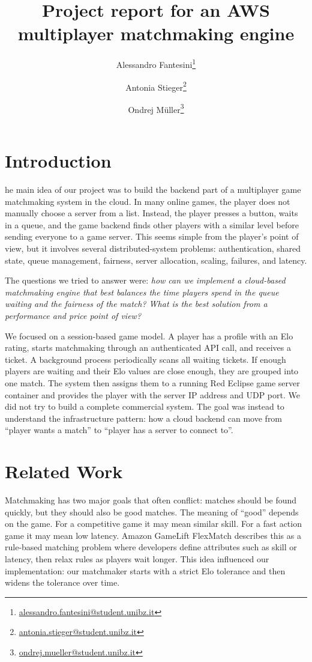 \documentclass[9pt,a4paper,twocolumn,twoside]{tau-class/tau}
\title{Project report for an AWS multiplayer matchmaking engine}
\author[a,1]{Alessandro Fantesini\thanks{\href{mailto:alessandro.fantesini@student.unibz.it}{alessandro.fantesini@student.unibz.it}}}
\author[b,2]{Antonia Stieger\thanks{\href{mailto:antonia.stieger@student.unibz.it}{antonia.stieger@student.unibz.it}}}
\author[c,3]{Ondrej M\"uller\thanks{\href{mailto:ondrej.mueller@student.unibz.it}{ondrej.mueller@student.unibz.it}}}
\affil[a]{Free University of Bozen-Bolzano, Italy}
\affil[b]{Free University of Bozen-Bolzano, Italy}
\affil[c]{Free University of Bozen-Bolzano, Italy}
\begin{document}
    \maketitle
    \thispagestyle{firststyle}


\section{Introduction}

    he main idea of our project was to build the backend part of a multiplayer game matchmaking system in the cloud. In many online games, the player does not manually choose a server from a list. Instead, the player presses a button, waits in a queue, and the game backend finds other players with a similar level before sending everyone to a game server. This seems simple from the player's point of view, but it involves several distributed-system problems: authentication, shared state, queue management, fairness, server allocation, scaling, failures, and latency.

    The questions we tried to answer were: \textit{how can we implement a cloud-based matchmaking engine that best balances the time players spend in the queue waiting and the fairness of the match? What is the best solution from a performance and price point of view?} 
    
    We focused on a session-based game model. A player has a profile with an Elo rating, starts matchmaking through an authenticated API call, and receives a ticket. A background process periodically scans all waiting tickets. If enough players are waiting and their Elo values are close enough, they are grouped into one match. The system then assigns them to a running Red Eclipse game server container and provides the player with the server IP address and UDP port.
    We did not try to build a complete commercial system. 
    The goal was instead to understand the infrastructure pattern: how a cloud backend can move from ``player wants a match'' to ``player has a server to connect to''.

\section{Related Work}

    Matchmaking has two major goals that often conflict: matches should be found quickly, but they should also be good matches. The meaning of ``good'' depends on the game. For a competitive game it may mean similar skill. For a fast action game it may mean low latency. 
    Amazon GameLift FlexMatch \cite{awsFlexMatch2017,awsFlexMatch2024} describes this as a rule-based matching problem where developers define attributes such as skill or latency, then relax rules as players wait longer. This idea influenced our implementation: our matchmaker starts with a strict Elo tolerance and then widens the tolerance over time.
\end{document}

